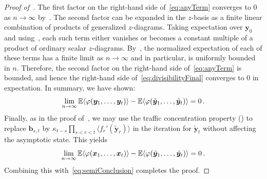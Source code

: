 \begin{proof}[Proof of~]
    The first factor on the right-hand side
    of~\cref{eq:anyTerm} converges to $0$ as $n\to\infty$
    by~.
    The second factor can be expanded in the $z$-basis as a finite linear combination of products of generalized $z$-diagrams. 
    Taking expectation over $\bm y_0$ and using~, each such term either vanishes or becomes a constant multiple of a product of ordinary scalar $z$-diagrams.
    By~, the normalized expectation of each of these terms has a finite limit as $n\to\infty$ and in particular, is uniformly bounded in $n$. 
    Therefore, the second factor on the right-hand side of~\cref{eq:anyTerm} is bounded, and hence the right-hand side of~\cref{eq:divisibilityFinal} converges to $0$ in expectation.
    In summary, we have shown:
    \begin{equation}
        \lim_{n\to\infty} \operatorname*{\mathbb{E}} \langle \varphi(\bm y_1, \ldots, \bm y_t)\rangle - \operatorname*{\mathbb{E}} \langle \varphi(\tilde{\bm y}_1, \ldots, \tilde{\bm y}_t)\rangle = 0\,.\label{eq:semiConclusion}
    \end{equation}
    Finally, as in the proof of~, we may use the traffic concentration property () to replace ${\bm b}_{s,t}$ by $\kappa_{t-s} \prod_{s<r<t} \langle f_r'(\tilde{\bm y}_r)\rangle$ in the iteration for $\tilde{\bm y}_t$ without affecting the asymptotic state. This yields
    \[
        \lim_{n\to\infty} \operatorname*{\mathbb{E}} \langle \varphi (\bm x_1, \ldots, \bm x_t)\rangle - \operatorname*{\mathbb{E}} \langle \varphi(\tilde {\bm y}_1, \ldots, \tilde{\bm y}_t)\rangle = 0\,.
    \]
    Combining this with~\cref{eq:semiConclusion} completes the proof.
\end{proof}

